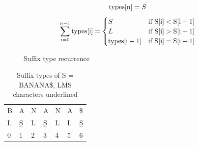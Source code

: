 \begin{figure}[t]
    \begin{center}
	$$
        \mathrm{types}[{\mathrm{n}}] = S
	$$
	$$
        \sum^{n - 1}_{i = 0}\mathrm{types}[{\mathrm{i}}] =
        \begin{cases}
            S & \textrm{if\ } \mathrm{S}[{\mathrm{i}}] < \mathrm{S}[{\mathrm{i + 1}}] \\
            L & \textrm{if\ } \mathrm{S}[{\mathrm{i}}] > \mathrm{S}[{\mathrm{i + 1}}] \\
            \mathrm{types}[{\mathrm{i + 1}}] & \textrm{if\ } \mathrm{S}[{\mathrm{i}}] = \mathrm{S}[{\mathrm{i + 1}}] 
        \end{cases}
	$$

	\caption{Suffix type recurrence}
	\label{eq:suffixtypesrecurrence}
    \end{center}
\end{figure}

\begin{table}[t]
    \begin{center}
        \begin{tabular}[c]{l l l l l l l}
            B & A & N & A & N & A & \$ \\ 
            L & \underline{S} & L & \underline{S} & L & L & \underline{S} \\ 
            0 & 1 & 2 & 3 & 4 & 5 & 6 \\ 
        \end{tabular}
    \end{center}
    \caption{Suffix types of S = BANANA\$, LMS characters underlined}
    \label{tab:suffixtypesbanana}
\end{table}


